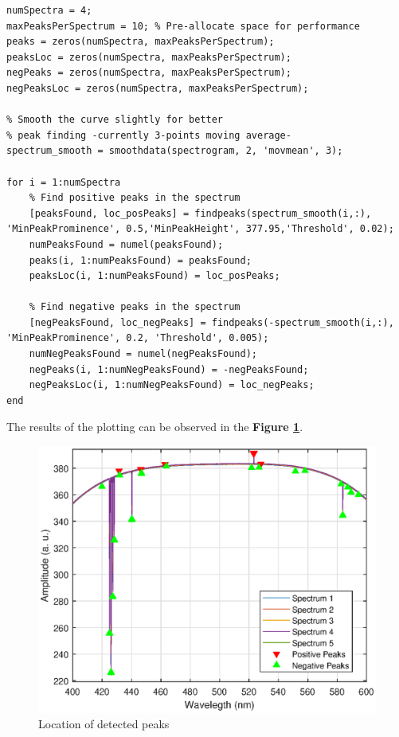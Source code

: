 \begin{lstlisting}
numSpectra = 4; 
maxPeaksPerSpectrum = 10; % Pre-allocate space for performance
peaks = zeros(numSpectra, maxPeaksPerSpectrum);
peaksLoc = zeros(numSpectra, maxPeaksPerSpectrum);
negPeaks = zeros(numSpectra, maxPeaksPerSpectrum);
negPeaksLoc = zeros(numSpectra, maxPeaksPerSpectrum);

% Smooth the curve slightly for better 
% peak finding -currently 3-points moving average-
spectrum_smooth = smoothdata(spectrogram, 2, 'movmean', 3);

for i = 1:numSpectra
    % Find positive peaks in the spectrum
    [peaksFound, loc_posPeaks] = findpeaks(spectrum_smooth(i,:), 'MinPeakProminence', 0.5,'MinPeakHeight', 377.95,'Threshold', 0.02);
    numPeaksFound = numel(peaksFound);
    peaks(i, 1:numPeaksFound) = peaksFound;
    peaksLoc(i, 1:numPeaksFound) = loc_posPeaks;
        
    % Find negative peaks in the spectrum
    [negPeaksFound, loc_negPeaks] = findpeaks(-spectrum_smooth(i,:), 'MinPeakProminence', 0.2, 'Threshold', 0.005);
    numNegPeaksFound = numel(negPeaksFound);
    negPeaks(i, 1:numNegPeaksFound) = -negPeaksFound;
    negPeaksLoc(i, 1:numNegPeaksFound) = loc_negPeaks;
end
\end{lstlisting}
The results of the plotting can be observed in the \textbf{Figure \ref{fig:Figure 5}}.

\begin{figure}[H]
    \centering
    \includegraphics[width = 1\textwidth ]{figures/peakDetection1.eps}
    \caption{Location of detected peaks }
    \label{fig:Figure 5}
\end{figure}

